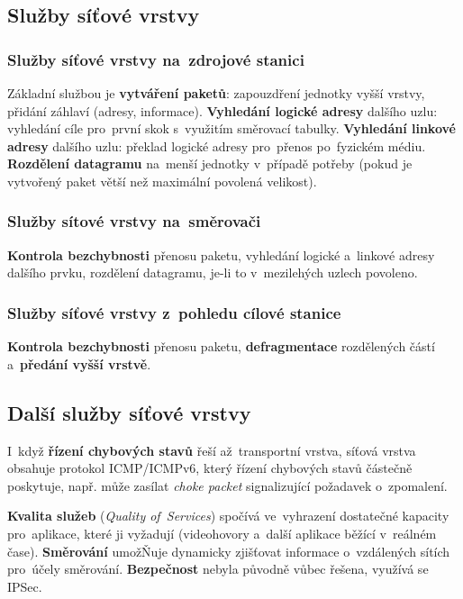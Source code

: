 \subsection{Služby síťové vrstvy}

\subsubsection{Služby síťové vrstvy na~zdrojové stanici}

Základní službou je \textbf{vytváření paketů}: zapouzdření jednotky vyšší vrstvy, přidání záhlaví (adresy, informace). \textbf{Vyhledání logické adresy} dalšího uzlu: vyhledání cíle pro~první skok s~využitím směrovací tabulky. \textbf{Vyhledání linkové adresy} dalšího uzlu: překlad logické adresy pro~přenos po~fyzickém médiu. \textbf{Rozdělení datagramu} na~menší jednotky v~případě potřeby (pokud je vytvořený paket větší než maximální povolená velikost).

\subsubsection{Služby sítové vrstvy na~směrovači}

\textbf{Kontrola bezchybnosti} přenosu paketu, vyhledání logické a~linkové adresy dalšího prvku, rozdělení datagramu, je-li to v~mezilehých uzlech povoleno.

\subsubsection{Služby síťové vrstvy z~pohledu cílové stanice}

\textbf{Kontrola bezchybnosti} přenosu paketu, \textbf{defragmentace} rozdělených částí a~\textbf{předání vyšší vrstvě}.

\subsection{Další služby síťové vrstvy}

I~když \textbf{řízení chybových stavů} řeší až~transportní vrstva, síťová vrstva obsahuje protokol ICMP/ICMPv6, který řízení chybových stavů částečně poskytuje, např. může zasílat \emph{choke packet} signalizující požadavek o~zpomalení.

\textbf{Kvalita služeb} (\emph{Quality of~Services}) spočívá ve~vyhrazení dostatečné kapacity pro~aplikace, které ji vyžadují (videohovory a~další aplikace běžící v~reálném čase). \textbf{Směrování} umožŇuje dynamicky zjišťovat informace o~vzdálených sítích pro~účely směrování. \textbf{Bezpečnost} nebyla původně vůbec řešena, využívá se IPSec.

